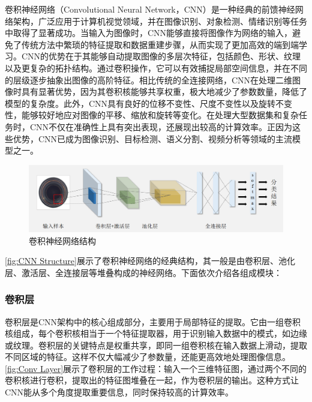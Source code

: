 \documentclass[lang=chs, degree=master, blindreview=false, adobe=false]{yanputhesis}
\begin{document}
卷积神经网络（Convolutional Neural Network，CNN）\cite{lecun1998gradient}是一种经典的前馈神经网络架构，广泛应用于计算机视觉领域，并在图像识别\cite{krizhevsky2012imagenet}、对象检测\cite{girshick2014rich}、情绪识别\cite{mollahosseini2017affectnet}等任务中取得了显著成功。当输入为图像时，CNN能够直接将图像作为网络的输入，避免了传统方法中繁琐的特征提取和数据重建步骤，从而实现了更加高效的端到端学习。CNN的优势在于其能够自动提取图像的多层次特征，包括颜色、形状、纹理以及更复杂的拓扑结构。通过卷积操作，它可以有效捕捉局部空间信息，并在不同的层级逐步抽象出图像的高阶特征。相比传统的全连接网络，CNN在处理二维图像时具有显著优势，因为其卷积核能够共享权重，极大地减少了参数数量，降低了模型的复杂度。此外，CNN具有良好的位移不变性、尺度不变性以及旋转不变性，能够较好地应对图像的平移、缩放和旋转等变化。在处理大型数据集和复杂任务时，CNN不仅在准确性上具有突出表现，还展现出较高的计算效率。正因为这些优势，CNN已成为图像识别\cite{krizhevsky2012imagenet}、目标检测\cite{ren2016faster}、语义分割\cite{long2015fully}、视频分析\cite{tran2015learning}等领域的主流模型之一。

\begin{figure}[htb]
	\centering
	\includegraphics[width=1\linewidth]{figs/卷积神经网络结构.png}
	\caption{卷积神经网络结构}
	\label{fig:CNN Structure}
\end{figure}

\autoref{fig:CNN Structure}展示了卷积神经网络的经典结构，其一般是由卷积层、池化层、激活层、全连接层等堆叠构成的神经网络。下面依次介绍各组成模块：

\subsubsection{卷积层}

卷积层是CNN架构中的核心组成部分，主要用于局部特征的提取。它由一组卷积核组成，每个卷积核相当于一个特征提取器，用于识别输入数据中的模式，如边缘或纹理。卷积层的关键特点是权重共享，即同一组卷积核在输入数据上滑动，提取不同区域的特征。这样不仅大幅减少了参数量，还能更高效地处理图像信息。\autoref{fig:Conv Layer}展示了卷积层的工作过程：输入一个三维特征图，通过两个不同的卷积核进行卷积，提取出的特征图堆叠在一起，作为卷积层的输出。这种方式让CNN能从多个角度提取重要信息，同时保持较高的计算效率。
\end{document}
